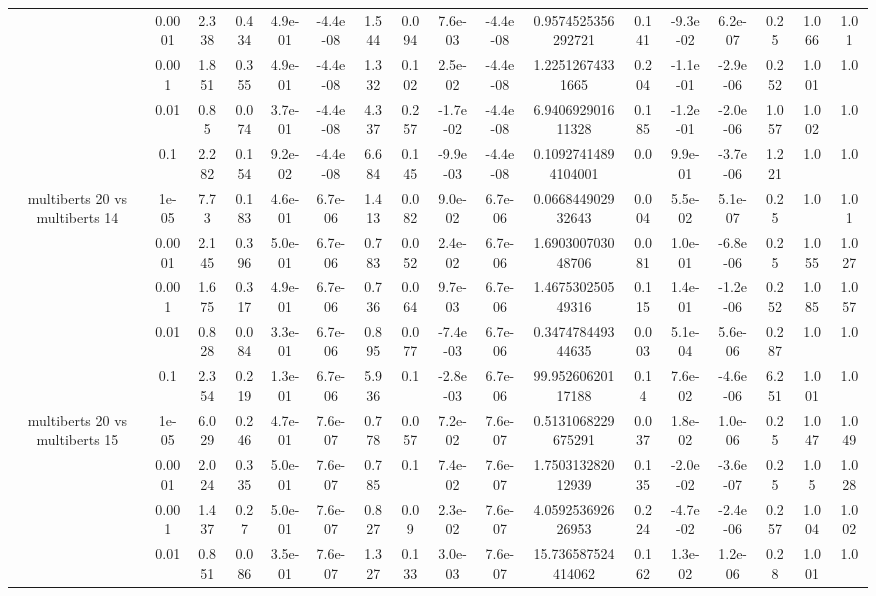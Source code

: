 \begin{tabular}{|c|c|c|c|c|c|c|c|c|c|c|c|c|c|c|c|c|}
 & 0.0001 & 2.338 & 0.434 & 4.9e-01 & -4.4e-08 & 1.544 & 0.094 & 7.6e-03 & -4.4e-08 & 0.9574525356292721 & 0.141 & -9.3e-02 & 6.2e-07 & 0.25 & 1.066 & 1.01 \\
 & 0.001 & 1.851 & 0.355 & 4.9e-01 & -4.4e-08 & 1.332 & 0.102 & 2.5e-02 & -4.4e-08 & 1.22512674331665 & 0.204 & -1.1e-01 & -2.9e-06 & 0.252 & 1.001 & 1.0 \\
 & 0.01 & 0.85 & 0.074 & 3.7e-01 & -4.4e-08 & 4.337 & 0.257 & -1.7e-02 & -4.4e-08 & 6.940692901611328 & 0.185 & -1.2e-01 & -2.0e-06 & 1.057 & 1.002 & 1.0 \\
 & 0.1 & 2.282 & 0.154 & 9.2e-02 & -4.4e-08 & 6.684 & 0.145 & -9.9e-03 & -4.4e-08 & 0.10927414894104001 & 0.0 & 9.9e-01 & -3.7e-06 & 1.221 & 1.0 & 1.0 \\
\hline
\multirow{5}{*}{multiberts 20 vs multiberts 14} & 1e-05 & 7.73 & 0.183 & 4.6e-01 & 6.7e-06 & 1.413 & 0.082 & 9.0e-02 & 6.7e-06 & 0.066844902932643 & 0.004 & 5.5e-02 & 5.1e-07 & 0.25 & 1.0 & 1.01 \\
 & 0.0001 & 2.145 & 0.396 & 5.0e-01 & 6.7e-06 & 0.783 & 0.052 & 2.4e-02 & 6.7e-06 & 1.690300703048706 & 0.081 & 1.0e-01 & -6.8e-06 & 0.25 & 1.055 & 1.027 \\
 & 0.001 & 1.675 & 0.317 & 4.9e-01 & 6.7e-06 & 0.736 & 0.064 & 9.7e-03 & 6.7e-06 & 1.467530250549316 & 0.115 & 1.4e-01 & -1.2e-06 & 0.252 & 1.085 & 1.057 \\
 & 0.01 & 0.828 & 0.084 & 3.3e-01 & 6.7e-06 & 0.895 & 0.077 & -7.4e-03 & 6.7e-06 & 0.347478449344635 & 0.003 & 5.1e-04 & 5.6e-06 & 0.287 & 1.0 & 1.0 \\
 & 0.1 & 2.354 & 0.219 & 1.3e-01 & 6.7e-06 & 5.936 & 0.1 & -2.8e-03 & 6.7e-06 & 99.95260620117188 & 0.14 & 7.6e-02 & -4.6e-06 & 6.251 & 1.001 & 1.0 \\
\hline
\multirow{5}{*}{multiberts 20 vs multiberts 15} & 1e-05 & 6.029 & 0.246 & 4.7e-01 & 7.6e-07 & 0.778 & 0.057 & 7.2e-02 & 7.6e-07 & 0.5131068229675291 & 0.037 & 1.8e-02 & 1.0e-06 & 0.25 & 1.047 & 1.049 \\
 & 0.0001 & 2.024 & 0.335 & 5.0e-01 & 7.6e-07 & 0.785 & 0.1 & 7.4e-02 & 7.6e-07 & 1.750313282012939 & 0.135 & -2.0e-02 & -3.6e-07 & 0.25 & 1.05 & 1.028 \\
 & 0.001 & 1.437 & 0.27 & 5.0e-01 & 7.6e-07 & 0.827 & 0.09 & 2.3e-02 & 7.6e-07 & 4.059253692626953 & 0.224 & -4.7e-02 & -2.4e-06 & 0.257 & 1.004 & 1.002 \\
 & 0.01 & 0.851 & 0.086 & 3.5e-01 & 7.6e-07 & 1.327 & 0.133 & 3.0e-03 & 7.6e-07 & 15.736587524414062 & 0.162 & 1.3e-02 & 1.2e-06 & 0.28 & 1.001 & 1.0 \\

\end{tabular}
